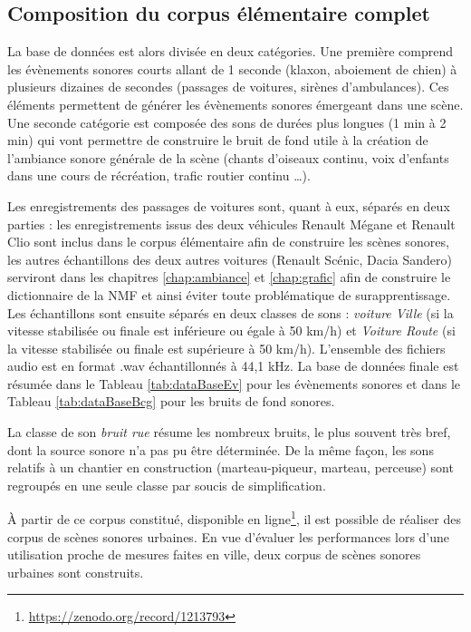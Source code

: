 \subsection{Composition du corpus élémentaire complet}

La base de données est alors divisée en deux catégories. Une première comprend les évènements sonores courts allant de 1 seconde (klaxon, aboiement de chien) à plusieurs dizaines de secondes (passages de voitures, sirènes d'ambulances). Ces éléments permettent de générer les évènements sonores émergeant dans une scène. Une seconde catégorie est composée des sons de durées plus longues (1 min à 2 min) qui vont permettre de construire le bruit de fond utile à la création de l'ambiance sonore générale de la scène (chants d'oiseaux continu, voix d'enfants dans une cours de récréation, trafic routier continu \dots).

Les enregistrements des passages de voitures sont, quant à eux, séparés en deux parties : les enregistrements issus des deux  véhicules Renault Mégane et Renault Clio sont inclus dans le corpus élémentaire afin de construire les scènes sonores, les autres échantillons des deux autres voitures (Renault Scénic, Dacia Sandero) serviront dans les chapitres \ref{chap:ambiance} et \ref{chap:grafic} afin de construire le dictionnaire de la NMF et ainsi éviter toute problématique de surapprentissage.
Les échantillons sont ensuite séparés en deux classes de sons : \textit{voiture Ville} (si la vitesse stabilisée ou finale est inférieure ou égale à 50 km/h) et \textit{Voiture Route} (si la vitesse stabilisée ou finale est supérieure à 50 km/h). L'ensemble des fichiers audio est en format .wav échantillonnés à 44,1 kHz. La base de données finale est résumée dans le Tableau \ref{tab:dataBaseEv} pour les évènements sonores et dans le Tableau \ref{tab:dataBaseBcg} pour les bruits de fond sonores.



La classe de son \textit{bruit rue} résume les nombreux bruits, le plus souvent très bref, dont la source sonore n'a pas pu être déterminée. De la même façon, les sons relatifs à un chantier en construction (marteau-piqueur, marteau, perceuse) sont regroupés en une seule classe par soucis de simplification.

À partir de ce corpus constitué, disponible en ligne\footnote{\url{https://zenodo.org/record/1213793}}, il est possible de réaliser des corpus de scènes sonores urbaines. En vue d'évaluer les performances lors d'une utilisation proche de mesures faites en ville, deux corpus de scènes sonores urbaines sont construits.

